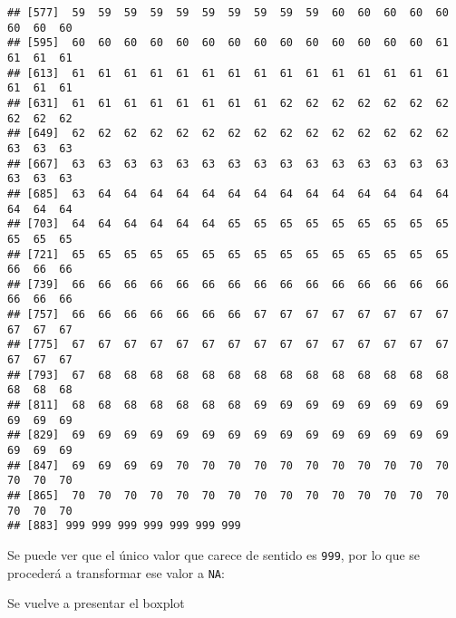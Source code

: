 \documentclass[
  spanish,
]{article}
\newenvironment{Shaded}{\begin{snugshade}}{\end{snugshade}}
\newcommand{\DataTypeTok}[1]{\textcolor[rgb]{0.13,0.29,0.53}{#1}}
\newcommand{\DecValTok}[1]{\textcolor[rgb]{0.00,0.00,0.81}{#1}}
\newcommand{\KeywordTok}[1]{\textcolor[rgb]{0.13,0.29,0.53}{\textbf{#1}}}
\newcommand{\NormalTok}[1]{#1}
\newcommand{\OperatorTok}[1]{\textcolor[rgb]{0.81,0.36,0.00}{\textbf{#1}}}
\newcommand{\OtherTok}[1]{\textcolor[rgb]{0.56,0.35,0.01}{#1}}
\newcommand{\StringTok}[1]{\textcolor[rgb]{0.31,0.60,0.02}{#1}}
\begin{document}
\begin{verbatim}
## [577]  59  59  59  59  59  59  59  59  59  59  60  60  60  60  60  60  60  60
## [595]  60  60  60  60  60  60  60  60  60  60  60  60  60  60  61  61  61  61
## [613]  61  61  61  61  61  61  61  61  61  61  61  61  61  61  61  61  61  61
## [631]  61  61  61  61  61  61  61  61  62  62  62  62  62  62  62  62  62  62
## [649]  62  62  62  62  62  62  62  62  62  62  62  62  62  62  62  63  63  63
## [667]  63  63  63  63  63  63  63  63  63  63  63  63  63  63  63  63  63  63
## [685]  63  64  64  64  64  64  64  64  64  64  64  64  64  64  64  64  64  64
## [703]  64  64  64  64  64  64  65  65  65  65  65  65  65  65  65  65  65  65
## [721]  65  65  65  65  65  65  65  65  65  65  65  65  65  65  65  66  66  66
## [739]  66  66  66  66  66  66  66  66  66  66  66  66  66  66  66  66  66  66
## [757]  66  66  66  66  66  66  66  67  67  67  67  67  67  67  67  67  67  67
## [775]  67  67  67  67  67  67  67  67  67  67  67  67  67  67  67  67  67  67
## [793]  67  68  68  68  68  68  68  68  68  68  68  68  68  68  68  68  68  68
## [811]  68  68  68  68  68  68  68  69  69  69  69  69  69  69  69  69  69  69
## [829]  69  69  69  69  69  69  69  69  69  69  69  69  69  69  69  69  69  69
## [847]  69  69  69  69  70  70  70  70  70  70  70  70  70  70  70  70  70  70
## [865]  70  70  70  70  70  70  70  70  70  70  70  70  70  70  70  70  70  70
## [883] 999 999 999 999 999 999 999
\end{verbatim}

Se puede ver que el único valor que carece de sentido es \texttt{999},
por lo que se procederá a transformar ese valor a \texttt{NA}:

\begin{Shaded}
\end{Shaded}

Se vuelve a presentar el boxplot

\begin{Shaded}
\end{Shaded}
\end{document}
